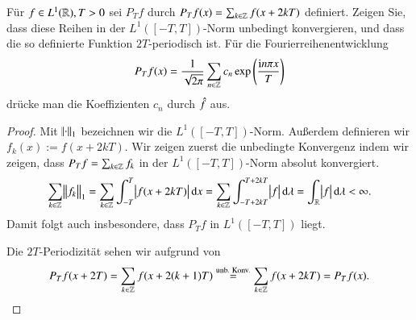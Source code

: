 
\begin{exercise}
  Für $f \in L^1(\mathbb{R}), T>0$ sei $P_T f$ durch $P_T f(x)=\sum_{k \in \mathbb{Z}}{f(x+2kT)}$ definiert. Zeigen Sie, dass diese Reihen in der $L^1([-T,T])$-Norm unbedingt konvergieren, und dass die so definierte Funktion $2T$-periodisch ist. Für die Fourierreihenentwicklung
  \begin{equation*}
    P_T f(x)=\frac{1}{\sqrt{2\pi}} \sum_{n \in \mathbb{Z}}{c_n \exp\left(\frac{\mathrm{i} n\pi x}{T}\right)}
  \end{equation*}
  drücke man die Koeffizienten $c_n$ durch $\hat{f}$ aus.
\end{exercise}

\begin{proof}
   Mit $\norm{\cdot}_1$ bezeichnen wir die $L^1([-T,T])$-Norm. Außerdem definieren wir $f_k(x):=f(x+2kT)$. Wir zeigen zuerst die unbedingte Konvergenz indem wir zeigen, dass $P_T f = \sum_{k \in \mathbb{Z}}{f_k}$ in der $L^1([-T,T])$-Norm absolut konvergiert.
   \begin{equation}
     \label{eq:absolute-convergence}
     \sum_{k \in \Z}{\norm{f_k}_1}=\sum_{k \in \Z}{\int_{-T}^T{\abs{f(x+2kT)} \dif x}}
     = \sum_{k \in \Z}{\int_{-T+2kT}^{T+2kT}{\abs{f} \dif \lambda}}
     = \int_\R{\abs{f} \dif \lambda}
     < \infty.
   \end{equation}
  Damit folgt auch insbesondere, dass $P_T f$ in $L^1([-T,T])$ liegt.

  Die $2T$-Periodizität sehen wir aufgrund von
  \begin{equation*}
    P_T f(x + 2T) = \sum_{k \in \mathbb{Z}}{f(x + 2(k+1)T)} \stackrel{\text{unb. Konv.}}{=} \sum_{k \in \mathbb{Z}}{f(x + 2kT)} = P_T f(x).
  \end{equation*}


\end{proof}
